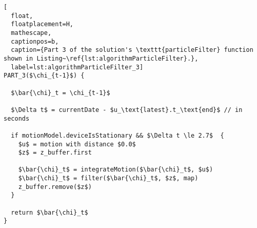 \begin{lstlisting}[
  float,
  floatplacement=H,
  mathescape,
  captionpos=b,
  caption={Part 3 of the solution's \texttt{particleFilter} function shown in Listing~\ref{lst:algorithmParticleFilter}.},
  label=lst:algorithmParticleFilter_3]
PART_3($\chi_{t-1}$) {

  $\bar{\chi}_t = \chi_{t-1}$

  $\Delta t$ = currentDate - $u_\text{latest}.t_\text{end}$ // in seconds

  if motionModel.deviceIsStationary && $\Delta t \le 2.7$  {
    $u$ = motion with distance $0.0$
    $z$ = z_buffer.first

    $\bar{\chi}_t$ = integrateMotion($\bar{\chi}_t$, $u$)
    $\bar{\chi}_t$ = filter($\bar{\chi}_t$, $z$, map)
    z_buffer.remove($z$)
  }

  return $\bar{\chi}_t$
}
\end{lstlisting}
